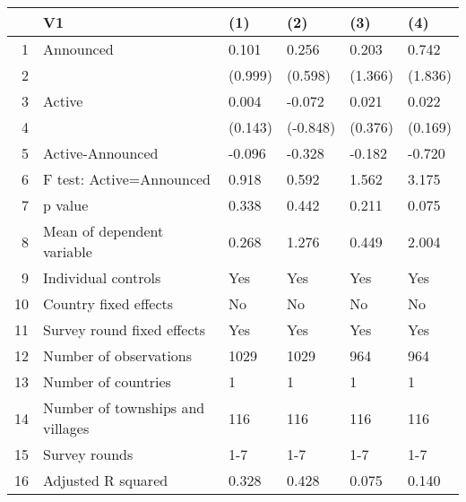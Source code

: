 \begin{table}[ht]
\centering
\begin{tabular}{rlllll}
  \hline
 & V1 & (1) & (2) & (3) & (4) \\ 
  \hline
1 & Announced & 0.101 & 0.256 & 0.203 & 0.742 \\ 
  2 &  & (0.999) & (0.598) & (1.366) & (1.836) \\ 
  3 & Active & 0.004 & -0.072 & 0.021 & 0.022 \\ 
  4 &  & (0.143) & (-0.848) & (0.376) & (0.169) \\ 
  5 & Active-Announced & -0.096 & -0.328 & -0.182 & -0.720 \\ 
  6 & F test: Active=Announced & 0.918 & 0.592 & 1.562 & 3.175 \\ 
  7 & p value & 0.338 & 0.442 & 0.211 & 0.075 \\ 
  8 & Mean of dependent variable & 0.268 & 1.276 & 0.449 & 2.004 \\ 
  9 & Individual controls & Yes & Yes & Yes & Yes \\ 
  10 & Country fixed effects & No & No & No & No \\ 
  11 & Survey round fixed effects & Yes & Yes & Yes & Yes \\ 
  12 & Number of observations & 1029 & 1029 & 964 & 964 \\ 
  13 & Number of countries & 1 & 1 & 1 & 1 \\ 
  14 & Number of townships and villages & 116 & 116 & 116 & 116 \\ 
  15 & Survey rounds & 1-7 & 1-7 & 1-7 & 1-7 \\ 
  16 & Adjusted R squared & 0.328 & 0.428 & 0.075 & 0.140 \\ 
   \hline
\end{tabular}
\end{table}
